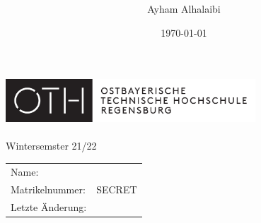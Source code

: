 \documentclass[10pt, journal]{IEEEtran}			%
\title{\FS \ \Fach}
\author{Ayham Alhalaibi}
\date{\today}
\def\MatNr{SECRET} %
\def\Semester{Wintersemster 21/22}
\begin{document}
\begin{titlepage}
	\thispagestyle{empty}

	\begin{center}
        \includegraphics[width=0.7\textwidth]{./OTHR_OTHR_Logo.pdf}\\
		\Huge
		\textsc{\MyTitle}\\
		\normalsize
		\Semester

		{\renewcommand{\arraystretch}{1.5}
			\begin{tabular}{l l}
				Name:            & \hspace{4cm}\MyAuthor \\
				Matrikelnummer:  & \hspace{4cm}\MatNr    \\
				Letzte Änderung: & \hspace{4cm}\MyDate
			\end{tabular}
		}

	\end{center}
\end{titlepage}








\end{document}
